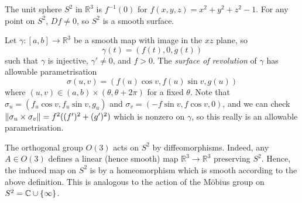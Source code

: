 \begin{example}
	The unit sphere \( S^2 \) in \( \mathbb R^3 \) is \( f^{-1}(0) \) for \( f(x,y,z) = x^2 + y^2 + z^2 - 1 \).
	For any point on \( S^2 \), \( Df \neq 0 \), so \( S^2 \) is a smooth surface.
\end{example}
\begin{example}
	Let \( \gamma \colon [a,b] \to \mathbb R^3 \) be a smooth map with image in the \( xz \) plane, so
	\[ \gamma(t) = (f(t), 0, g(t)) \]
	such that \( \gamma \) is injective, \( \gamma' \neq 0 \), and \( f > 0 \).
	The \textit{surface of revolution} of \( \gamma \) has allowable parametrisation
	\[ \sigma(u,v) = (f(u)\cos v, f(u)\sin v, g(u)) \]
	where \( (u,v) \in (a,b) \times (\theta, \theta + 2\pi) \) for a fixed \( \theta \).
	Note that \( \sigma_u = (f_u \cos v, f_u \sin v, g_u) \) and \( \sigma_v = (-f\sin v, f \cos v, 0) \), and we can check \( \norm{\sigma_u \times \sigma_v} = f^2 ((f')^2 + (g')^2) \) which is nonzero on \( \gamma \), so this really is an allowable parametrisation.
\end{example}
\begin{example}
	The orthogonal group \( O(3) \) acts on \( S^2 \) by diffeomorphisms.
	Indeed, any \( A \in O(3) \) defines a linear (hence smooth) map \( \mathbb R^3 \to \mathbb R^3 \) preserving \( S^2 \).
	Hence, the induced map on \( S^2 \) is by a homeomorphism which is smooth according to the above definition.
	This is analogous to the action of the M\"obius group on \( S^2 = \mathbb C \cup \qty{\infty} \).
\end{example}

